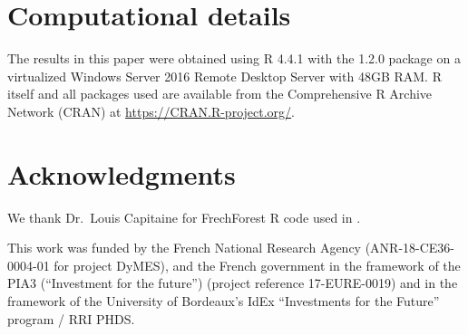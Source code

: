 \section*{Computational details}\label{computational-details}

The results in this paper were obtained using R 4.4.1 with the  1.2.0 package on a virtualized Windows Server 2016 Remote Desktop Server with 48GB RAM. R itself and all packages used are available from the Comprehensive R Archive Network (CRAN) at \url{https://CRAN.R-project.org/}.

\section*{Acknowledgments}\label{acknowledgments}

We thank Dr.~Louis Capitaine for FrechForest R code used in .

This work was funded by the French National Research Agency (ANR-18-CE36-0004-01 for project DyMES), and the French government in the framework of the PIA3 (``Investment for the future'') (project reference 17-EURE-0019) and in the framework of the University of Bordeaux's IdEx ``Investments for the Future'' program / RRI PHDS.



\address{%
Anthony Devaux\\
Inserm U1219 - Bordeaux Population Health - Université de Bordeaux - The George Institute for Global Health - UNSW Sydney - School of Population Health - UNSW Sydney\\%
Bordeaux (France) - Sydney (Australia)\\
%
%
\textit{ORCiD: \href{https://orcid.org/0000-0002-8862-4218}{0000-0002-8862-4218}}\\%
\href{mailto:anthony.devauxbarault@gmail.com}{\nolinkurl{anthony.devauxbarault@gmail.com}}%
}

\address{%
Cécile Proust-Lima\\
Inserm U1219 - Bordeaux Population Health - Université de Bordeaux\\%
Bordeaux (France)\\
%
%
\textit{ORCiD: \href{https://orcid.org/0000-0002-9884-955X}{0000-0002-9884-955X}}\\%
%
}

\address{%
Robin Genuer\\
Inserm U1219 - Bordeaux Population Health - Université de Bordeaux\\%
Bordeaux (France)\\
%
%
\textit{ORCiD: \href{https://orcid.org/0000-0002-0981-3943}{0000-0002-0981-3943}}\\%
%
}
